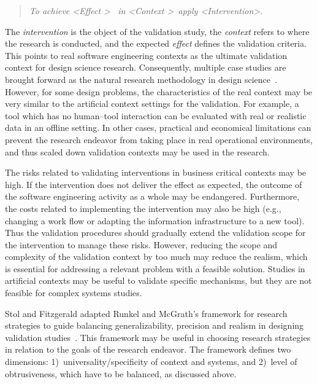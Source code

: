 \documentclass[graybox]{svmult}
\newcommand{\peggy}[1]{\textcolor{blue}{{\it [Peggy says: #1]}}}
\newcommand{\peggy}[1]{}
\begin{document}
\begin{quote}{\emph{To achieve \textless Effect \textgreater ~ in \textless Context \textgreater~apply \textless Intervention\textgreater}.} 
\end{quote} 
The \emph{intervention} is the object of the validation study,
 the \emph{context}  refers to where the research is conducted, and the expected \emph{effect} defines the validation criteria. This points to real software engineering contexts as the ultimate validation context for design science research. 
Consequently, multiple case studies are brought forward as the natural research methodology in design science~\cite{van_aken_management_2004}. However, for some design problems, the characteristics of the real context may be very similar to the artificial context settings for the validation. For example, a tool which has no human--tool interaction can be evaluated with real or realistic data in an offline setting. In other cases, practical and economical limitations can prevent the research endeavor from taking place in real operational environments, and thus scaled down validation contexts may be used in the research. 


The risks related to validating interventions in business critical contexts may be high. If the intervention does not deliver the effect as expected, the outcome of the software engineering activity as a whole may be endangered. Furthermore, the costs related to implementing the intervention may also be high (e.g., changing a work flow or adapting the information infrastructure to a new tool). Thus the validation procedures should gradually extend the validation scope for the intervention to manage these risks.
However, reducing the scope and complexity of the validation context by too much may reduce the realism, which is essential for addressing a relevant problem with a feasible solution. Studies in artificial contexts may be useful to validate specific mechanisms, but they are not feasible for complex systems studies.  

Stol and Fitzgerald adapted Runkel and McGrath's framework for research strategies to guide balancing generalizability, precision and realism in designing validation studies~\cite{StolABC18}. This framework may be useful in choosing research strategies in relation to the goals of the research endeavor. The framework defines two dimensions: 1)~universality/specificity of context and systems, and 2)~level of obtrusiveness, which have to be balanced, as discussed above. %
\end{document}
